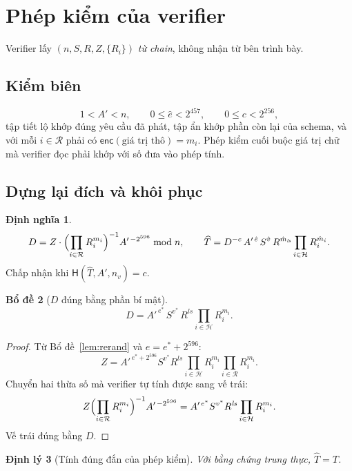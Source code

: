 \documentclass[a4paper,11pt]{article}
\theoremstyle{definition}
\newtheorem{definition}{Định nghĩa}[section]
\theoremstyle{plain}
\newtheorem{theorem}[definition]{Định lý}
\newtheorem{lemma}[definition]{Bổ đề}
\theoremstyle{remark}
\newcommand{\Hid}{\mathcal{H}}
\newcommand{\Rev}{\mathcal{R}}
\newcommand{\Hash}{\mathsf{H}}
\newcommand{\enc}{\mathsf{enc}}
\begin{document}
\section{Phép kiểm của verifier}

Verifier lấy $(n,S,R,Z,\{R_i\})$ \emph{từ chain}, không nhận từ bên trình bày.

\subsection{Kiểm biên}

\[
1<A'<n,\qquad 0\le \hat e < 2^{457},\qquad 0\le c<2^{256},
\]
tập tiết lộ khớp đúng yêu cầu đã phát, tập ẩn khớp phần còn lại của schema, và với mỗi
$i\in\Rev$ phải có $\enc(\text{giá trị thô})=m_i$. Phép kiểm cuối buộc giá trị chữ mà
verifier đọc phải khớp với số đưa vào phép tính.

\subsection{Dựng lại đích và khôi phục}

\begin{definition}
\[
D = Z \cdot \Bigl(\prod_{i\in\Rev} R_i^{m_i}\Bigr)^{-1} A'^{\,-2^{596}} \bmod n,
\qquad
\widehat T = D^{-c}\, A'^{\,\hat e}\, S^{\hat v}\, R^{\hat m_{\mathit{ls}}}
             \prod_{i\in\Hid} R_i^{\hat m_i}.
\]
Chấp nhận khi $\Hash(\widehat T, A', n_v) = c$.
\end{definition}

\begin{lemma}[$D$ đúng bằng phần bí mật]
\label{lem:D}
\[
D = A'^{\,e^{*}}\, S^{v^{*}}\, R^{\mathit{ls}} \prod_{i\in\Hid} R_i^{m_i}.
\]
\end{lemma}

\begin{proof}
Từ Bổ đề~\ref{lem:rerand} và $e=e^{*}+2^{596}$:
\[
Z = A'^{\,e^{*}+2^{596}} S^{v^{*}} R^{\mathit{ls}}
    \prod_{i\in\Hid} R_i^{m_i} \prod_{i\in\Rev} R_i^{m_i}.
\]
Chuyển hai thừa số mà verifier tự tính được sang vế trái:
\[
Z \Bigl(\prod_{i\in\Rev} R_i^{m_i}\Bigr)^{-1} A'^{\,-2^{596}}
= A'^{\,e^{*}} S^{v^{*}} R^{\mathit{ls}} \prod_{i\in\Hid} R_i^{m_i}.
\]
Vế trái đúng bằng $D$.
\end{proof}

\begin{theorem}[Tính đúng đắn của phép kiểm]
Với bằng chứng trung thực, $\widehat T = T$.
\end{theorem}
\end{document}
